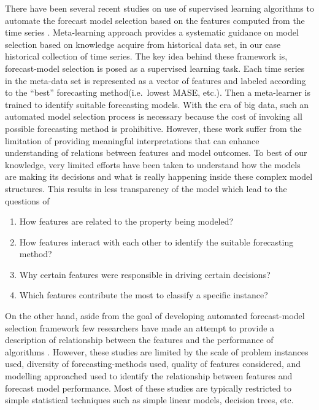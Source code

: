 \documentclass[11pt,a4paper,]{article}
\providecommand{\tightlist}{%
  \setlength{\itemsep}{0pt}\setlength{\parskip}{0pt}}
\theoremstyle{definition}
\theoremstyle{definition}
\theoremstyle{definition}
\theoremstyle{remark}
\begin{document}
There have been several recent studies on use of supervised learning
algorithms to automate the forecast model selection based on the
features computed from the time series
\autocites{shah1997model}{prudencio2004meta}{lemke2010meta}{kuck2016meta}.
Meta-learning approach provides a systematic guidance on model selection
based on knowledge acquire from historical data set, in our case
historical collection of time series. The key idea behind these
framework is, forecast-model selection is posed as a supervised learning
task. Each time series in the meta-data set is represented as a vector
of features and labeled according to the ``best'' forecasting
method(i.e.~lowest MASE, etc.). Then a meta-learner is trained to
identify suitable forecasting models. With the era of big data, such an
automated model selection process is necessary because the cost of
invoking all possible forecasting method is prohibitive. However, these
work suffer from the limitation of providing meaningful interpretations
that can enhance understanding of relations between features and model
outcomes. To best of our knowledge, very limited efforts have been taken
to understand how the models are making its decisions and what is really
happening inside these complex model structures. This results in less
transparency of the model which lead to the questions of

\begin{enumerate}
\def\labelenumi{\arabic{enumi}.}
\tightlist
\item
  How features are related to the property being modeled?
\item
  How features interact with each other to identify the suitable
  forecasting method?
\item
  Why certain features were responsible in driving certain decisions?
\item
  Which features contribute the most to classify a specific instance?
\end{enumerate}

On the other hand, aside from the goal of developing automated
forecast-model selection framework few researchers have made an attempt
to provide a description of relationship between the features and the
performance of algorithms
\autocites{schnaars1984situational}{wang2009rule}{lemke2010meta}{petropoulos2014horses}.
However, these studies are limited by the scale of problem instances
used, diversity of forecasting-methods used, quality of features
considered, and modelling approached used to identify the relationship
between features and forecast model performance. Most of these studies
are typically restricted to simple statistical techniques such as simple
linear models, decision trees, etc.
\end{document}
